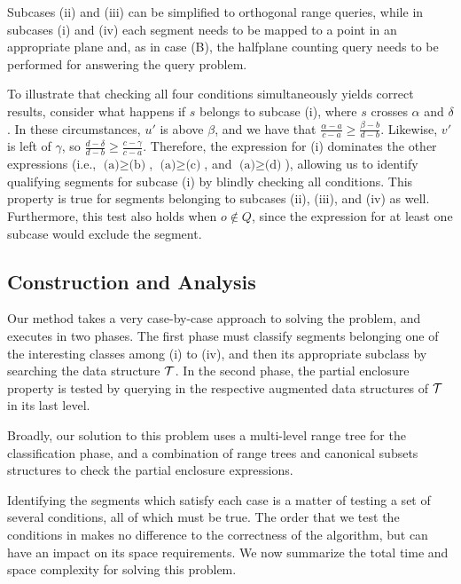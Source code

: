 Subcases (ii) and (iii) can be simplified to orthogonal range 
queries, while in subcases (i) and (iv) each segment needs to be mapped to 
a point in an appropriate plane and, as in case 
(B), the halfplane counting query needs to be performed for answering 
the query problem. 

To illustrate that checking all four conditions simultaneously 
yields correct results, consider what happens if $s$ belongs 
to subcase (i), where $s$ crosses $\alpha$ and $\delta$. In 
these circumstances, $u'$ is above $\beta$, and we have that 
$\frac{\alpha - a}{c - a} \geq \frac{\beta - b}{d - b}$.  
Likewise, $v'$ is left of $\gamma$, so $\frac{d - \delta}{d - b} 
\geq \frac{c - \gamma}{c - a}$.  Therefore, the expression for 
(i) dominates the other expressions (i.e., $\text{(a)} \geq 
\text{(b)}$, $\text{(a)} \geq \text{(c)}$, and $\text{(a)} \geq 
\text{(d)}$), allowing us to identify qualifying segments for 
subcase (i) by blindly checking all conditions. This property 
is true for segments belonging to subcases (ii), (iii), and (iv) 
as well. Furthermore, this test also holds when $o \not \in Q$, 
since the expression for at least one subcase would exclude the 
segment.


\subsection{Construction and Analysis}
\label{:rectangles:ao:analysis}

Our method takes a very case-by-case approach to solving the problem, 
and executes in two phases. The first phase must classify segments 
belonging one of the interesting classes among (i) to (iv), and then 
its appropriate subclass by searching the data structure $\cal T$.  
In the second phase, the partial enclosure property is tested by 
querying in the respective augmented data structures of $\cal T$ in 
its last level. 

Broadly, our solution to this problem uses a multi-level range tree 
\cite{Deberg} for the classification phase, and a combination of 
range trees and canonical subsets structures \cite{chan2012} to 
check the partial enclosure expressions. 

Identifying the segments which satisfy each case is a matter of 
testing a set of several conditions, all of which must be true. 
The order that we test the conditions in makes no difference to 
the correctness of the algorithm, but can have an impact on its 
space requirements. We now summarize the total time and space 
complexity for solving this problem. 

